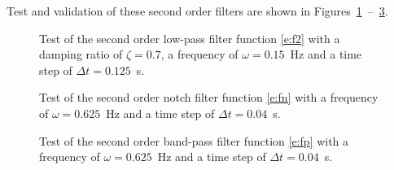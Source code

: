 Test and validation of these second order filters are shown in Figures~\ref{f:f2}~--~\ref{f:fp}.

\begin{figure}[b!]
\centerline{ }
\caption{Test of the second order low-pass filter function \eqref{e:f2} with a damping ratio of $\zeta=0.7$, a frequency of $\omega=0.15$~Hz and a time step of $\Delta t = 0.125$~s. \label{f:f2}}
\end{figure}

\begin{figure}[t]
\centerline{ }
\caption{Test of the second order notch filter function \eqref{e:fn} with a frequency of $\omega=0.625$~Hz and a time step of $\Delta t = 0.04$~s. \label{f:fn}}
\end{figure}

\begin{figure}[t]
\centerline{ }
\caption{Test of the second order band-pass filter function \eqref{e:fp} with a frequency of $\omega=0.625$~Hz and a time step of $\Delta t = 0.04$~s. \label{f:fp}}
\end{figure}
